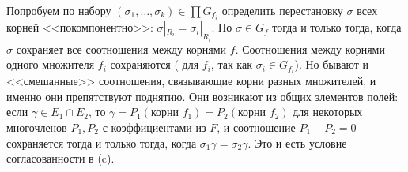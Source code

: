 \begin{remark}
Попробуем по набору $(\sigma_1,\dots,\sigma_k)\in\prod G_{f_i}$ определить перестановку $\sigma$ всех корней <<покомпонентно>>:
$\sigma|_{R_i}=\sigma_i|_{R_i}$. По  $\sigma\in G_f$ тогда и только тогда, когда $\sigma$ сохраняет все соотношения
между корнями $f$. Соотношения между корнями одного множителя $f_i$ сохраняются ( для $f_i$, так как
$\sigma_i\in G_{f_i}$). Но бывают и <<смешанные>> соотношения, связывающие корни разных множителей, и именно они
препятствуют поднятию. Они возникают из общих элементов полей: если $\gamma\in E_1\cap E_2$, то
$\gamma=P_1(\text{корни }f_1)=P_2(\text{корни }f_2)$ для некоторых многочленов $P_1,P_2$ с коэффициентами из $F$, и
соотношение $P_1-P_2=0$ сохраняется тогда и только тогда, когда $\sigma_1\gamma=\sigma_2\gamma$. Это и есть условие
согласованности в (c).
\end{remark}

